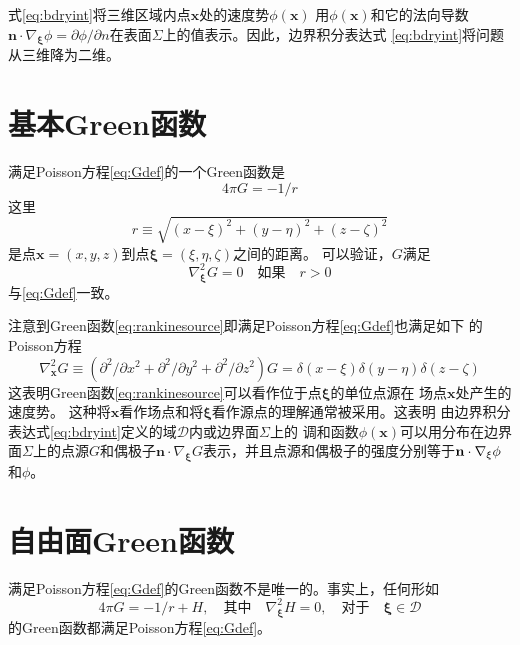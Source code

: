式\eqref{eq:bdryint}将三维区域内点$\mathbf{x}$处的速度势$\phi(\mathbf{x})$
用$\phi(\mathbf{x})$和它的法向导数$\mathbf{n}\cdot\nabla_{\bm{\xi}}\phi=
\partial\phi/\partial n$在表面$\Sigma$上的值表示。因此，边界积分表达式
\eqref{eq:bdryint}将问题从三维降为二维。

\section{基本Green函数}
\label{sec:rankinesource}

满足Poisson方程\eqref{eq:Gdef}的一个Green函数是
\begin{equation}
  4\pi G=-1/r
  \label{eq:rankinesource}
\end{equation}
这里
\begin{equation}
  r\equiv\sqrt{(x-\xi)^2+(y-\eta)^2+(z-\zeta)^2}
  \label{eq:r}
\end{equation}
是点$\mathbf{x}=(x,y,z)$到点$\bm{\xi}=(\xi,\eta,\zeta)$之间的距离。
可以验证，$G$满足
\begin{equation}
  \nabla^2_{\bm{\xi}}G=0\quad\text{如果}\quad r>0
  \label{eq:laplaceG}
\end{equation}
与\eqref{eq:Gdef}一致。

注意到Green函数\eqref{eq:rankinesource}即满足Poisson方程\eqref{eq:Gdef}也满足如下
的Poisson方程
\begin{equation}
  \nabla^2_{\mathbf{x}}G\equiv(\partial^2/\partial x^2+\partial^2/\partial y^2
  +\partial^2/\partial z^2)G=\delta(x-\xi)\delta(y-\eta)\delta(z-\zeta)
  \label{eq:Gphyintrp}
\end{equation}
这表明Green函数\eqref{eq:rankinesource}可以看作位于点$\bm{\xi}$的单位点源在
场点$\mathbf{x}$处产生的速度势。
这种将$\mathbf{x}$看作场点和将$\bm{\xi}$看作源点的理解通常被采用。这表明
由边界积分表达式\eqref{eq:bdryint}定义的域$\mathcal{D}$内或边界面$\Sigma$上的
调和函数$\phi(\mathbf{x})$可以用分布在边界面$\Sigma$上的点源$G$和偶极子$\mathbf{n}\cdot\nabla_{\bm{\xi}}G$表示，并且点源和偶极子的强度分别等于$\mathbf{n}\cdot\nabla_{\bf{\xi}}\phi$和$\phi$。



\section{自由面Green函数}
\label{sec:fsG}

满足Poisson方程\eqref{eq:Gdef}的Green函数不是唯一的。事实上，任何形如
\begin{equation}
  4\pi G=-1/r+H,\quad\text{其中}\quad \nabla^2_{\bm{\xi}}H=0,\quad\text{对于}
  \quad\bm{\xi}\in\mathcal{D}
  \label{eq:generalG}
\end{equation}
的Green函数都满足Poisson方程\eqref{eq:Gdef}。

